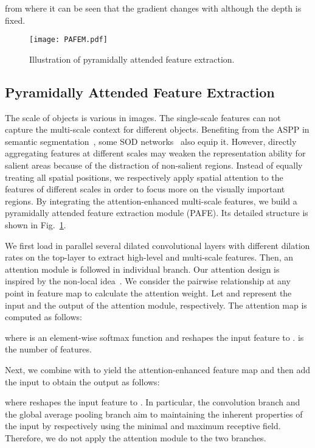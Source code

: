\documentclass[runningheads]{llncs}
\begin{document}
from where it can be seen that the gradient changes with  although the depth  is fixed. 

\begin{figure}[t]
\centering
\texttt{[image: PAFEM.pdf]}\\
 

\caption{Illustration of pyramidally attended feature extraction.}
\label{fig:PAFEM}
\end{figure}


\subsection{Pyramidally Attended Feature Extraction}\label{sec:PAFEM}
The scale of objects is various in images. The single-scale features can not capture the multi-scale context for different objects. Benefiting from the ASPP in semantic segmentation~\cite{Deeplab}, some SOD networks~\cite{R3Net,BMPM,PFA} also equip it. 
However, directly aggregating features at different scales may weaken the representation ability for salient areas because of the distraction of non-salient regions. Instead of equally treating all spatial positions, we respectively apply spatial attention to the features of different scales in order to focus more on the visually important regions.
By integrating the attention-enhanced multi-scale features, we build a pyramidally attended feature extraction module (PAFE). Its detailed structure is shown in Fig.~\ref{fig:PAFEM}.

We first load in parallel several dilated convolutional layers with different dilation rates on the top-layer  to extract high-level and multi-scale features. 
Then, an attention module is followed in individual branch. Our attention design is inspired by the non-local idea~\cite{Nonlocal}. We consider the pairwise relationship at any point in feature map to calculate the attention weight. Let  and  represent the input and the output of the attention module, respectively.  The attention map  is computed as follows:

where  is an element-wise softmax function and  reshapes the input feature to .  is the number of features.  

Next, we combine   with   to yield the attention-enhanced feature map and then add the input  to obtain the output  as follows: 

where  reshapes the input feature to .  
In particular, the  convolution branch and the global average pooling branch aim to maintaining the inherent properties of the input by respectively using the minimal and maximum receptive field. Therefore, we do not apply the attention module to the two branches.
\end{document}
